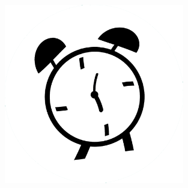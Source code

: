 \documentclass[a6paper,10pt]{article}
\begin{document}
\vspace{20pt}
\begin{figure}[!h]
\hspace{30pt}
\includegraphics[width=0.70\textwidth]{klocka.png}
\end{figure}
\end{document}
